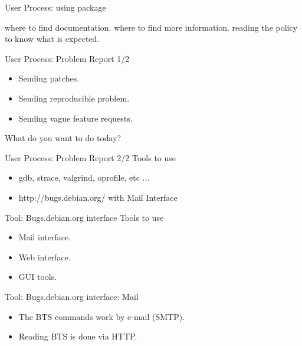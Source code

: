 \documentclass[cjk,dvipdfm,12pt]{beamer}
\begin{document}
\begin{frame}{User Process: using package}

where to find documentation.
where to find more information.
reading the policy to know what is expected.

\end{frame}

\begin{frame}{User Process: Problem Report 1/2}
\begin{itemize}
 \item Sending patches.
 \item Sending reproducible problem.
 \item Sending vague feature requests.
\end{itemize}

What do you want to do today?
\end{frame}

\begin{frame}{User Process: Problem Report 2/2}
Tools to use 
\begin{itemize}
 \item gdb, strace, valgrind, oprofile, etc ... 
 \item http://bugs.debian.org/ with Mail Interface
\end{itemize} 
\end{frame}

\begin{frame}{Tool: Bugs.debian.org interface}
Tools to use 
\begin{itemize}
 \item Mail interface.
 \item Web interface.
 \item GUI tools.
\end{itemize} 
\end{frame}


\begin{frame}[containsverbatim]{Tool: Bugs.debian.org interface: Mail}
\begin{minipage}{0.49\hsize}
\begin{itemize}
 \item The BTS commands work by e-mail (SMTP).
 \item Reading BTS is done via HTTP.
\end{itemize}
\end{minipage}
\begin{minipage}{0.49\hsize}
\end{minipage}
\end{frame}
\end{document}
